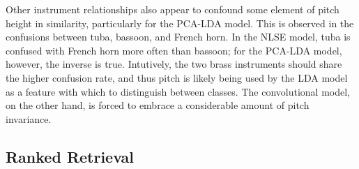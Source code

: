 Other instrument relationships also appear to confound some element of pitch height in similarity, particularly for the PCA-LDA model.
This is observed in the confusions between tuba, bassoon, and French horn.
In the NLSE model, tuba is confused with French horn more often than bassoon; for the PCA-LDA model, however, the inverse is true.
Intutively, the two brass instruments should share the higher confusion rate, and thus pitch is likely being used by the LDA model as a feature with which to distinguish between classes.
The convolutional model, on the other hand, is forced to embrace a considerable amount of pitch invariance.


\subsection{Ranked Retrieval}
